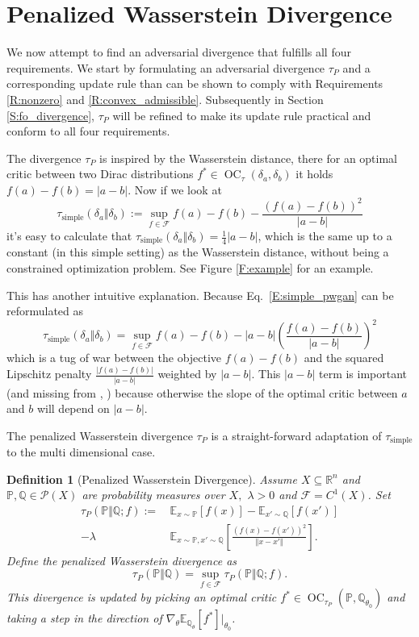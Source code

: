 \documentclass{article}
\DeclareMathOperator{\oc}{OC}
\newtheorem{definition}{Definition}
\begin{document}
\section{Penalized Wasserstein Divergence}\label{S:pen_divergence}
 We now attempt to find an adversarial
 divergence that fulfills all four requirements. We start by formulating an adversarial divergence $\tau_P$ and a corresponding update rule
 than can be shown to comply with Requirements \ref{R:nonzero} and \ref{R:convex_admissible}.
 Subsequently in Section \ref{S:fo_divergence}, $\tau_P$ will be refined to make its update rule
 practical and conform to all four requirements.

 The divergence $\tau_P$ is inspired by the Wasserstein distance, there for an optimal critic between two Dirac distributions
 $f^*\in\oc_{\tau}(\delta_a,\delta_b)$ it holds $f(a)-f(b)=|a-b|$. Now if we look at
 \begin{equation}\label{E:simple_pwgan}
  \tau_{\text{simple}}(\delta_a\Vert\delta_b):=\sup_{f\in\mathcal F}f(a)-f(b)-\frac{(f(a)-f(b))^2}{|a-b|}
 \end{equation}
 it's easy to calculate that $\tau_{\text{simple}}(\delta_a\Vert\delta_b)=\frac{1}{4}|a-b|$, which is the same up to a constant (in this simple setting)
 as the Wasserstein distance, without being a constrained optimization problem. See Figure \ref{F:example} for an example.

 This has another intuitive explanation. Because Eq.\ \ref{E:simple_pwgan} can be reformulated as
 \[\tau_{\text{simple}}(\delta_a\Vert\delta_b)=\sup_{f\in\mathcal F}f(a)-f(b)-|a-b|\left(\frac{f(a)-f(b)}{|a-b|}\right)^2\]
 which is a tug of war between the objective $f(a)-f(b)$ and the squared Lipschitz penalty $\frac{|f(a)-f(b)|}{|a-b|}$ weighted by $|a-b|$.
 This $|a-b|$ term is important (and missing from \cite{gulrajani2017improved}, \cite{petzka2017regularization})
 because otherwise the slope of the optimal critic between $a$ and $b$ will depend on $|a-b|$.

 The penalized Wasserstein divergence $\tau_P$ is a straight-forward adaptation of $\tau_{\text{simple}}$ to the multi dimensional case.
 \begin{definition}[Penalized Wasserstein Divergence]\label{D:pen_divergence}
  Assume $X\subseteq\mathbb R^n$ and $\mathbb P,\mathbb Q\in\mathcal P(X)$ are probability measures over $X,$ $\lambda>0$
  and $\mathcal F=C^1(X)$. Set
  \begin{align*}
   \tau_P(\mathbb P\Vert\mathbb Q;f):=\,&\mathbb E_{x\sim\mathbb P}[f(x)]-\mathbb E_{x'\sim\mathbb Q}[f(x')] \\
  -\lambda\,&\mathbb E_{x\sim\mathbb P,x'\sim\mathbb Q}\left[\frac{(f(x)-f(x'))^2}{\Vert x-x'\Vert}\right].
   \end{align*}
  Define the penalized Wasserstein divergence as
  \[\tau_P(\mathbb P\Vert\mathbb Q)=\sup_{f\in\mathcal F}\tau_P(\mathbb P\Vert\mathbb Q;f).\]
  This divergence is updated by picking an optimal critic $f^*\in\oc_{\tau_P}(\mathbb P,\mathbb Q_{\theta_0})$
  and taking a step in the direction of $\nabla_\theta\mathbb E_{\mathbb Q_\theta}[f^*]|_{\theta_0}$.
 \end{definition}
\end{document}
